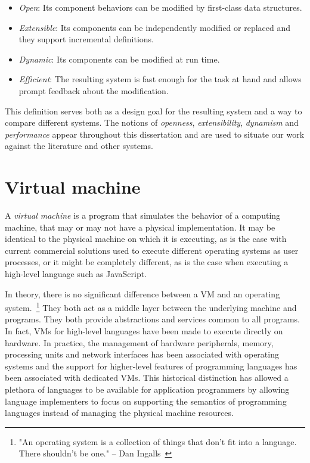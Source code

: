 \begin{itemize}
    \item \textit{Open}: Its component behaviors can be modified by first-class
        data structures. 
    \item \textit{Extensible}: Its components can be independently modified or
        replaced and they support incremental definitions. 
    \item \textit{Dynamic}: Its components can be modified at run time.
    \item \textit{Efficient}: The resulting system is fast enough for the task
        at hand and allows prompt feedback about the modification.
\end{itemize}

This definition serves both as a design goal for the resulting system and a way
to compare different systems. The notions of \textit{openness},
\textit{extensibility}, \textit{dynamism} and \textit{performance} appear
throughout this dissertation and are used to situate our work against the
literature and other systems.

\section{Virtual machine}

A \textit{virtual machine} is a program that simulates the behavior of a
computing machine, that may or may not have a physical implementation. It may
be identical to the physical machine on which it is executing, as is the case
with current commercial solutions used to execute different operating systems
as user processes, or it might be completely different, as is the case when
executing a high-level language such as JavaScript.  

In theory, there is no significant difference between a VM and
an operating system.~\footnote{"An operating system is a collection of
things that don't fit into a language. There shouldn't be one." -- Dan
Ingalls~\cite{Ingalls1981}} They both act as a middle layer between the
underlying machine and programs. They both provide abstractions and
services common to all programs. In fact, VMs for high-level
languages have been made to execute directly on hardware. In practice, the
management of hardware peripherals, memory, processing units and network
interfaces has been associated with operating systems and the support for
higher-level features of programming languages has been associated with
dedicated VMs. This historical distinction has allowed a plethora
of languages to be available for application programmers by allowing language
implementers to focus on supporting the semantics of programming languages
instead of managing the physical machine resources.

